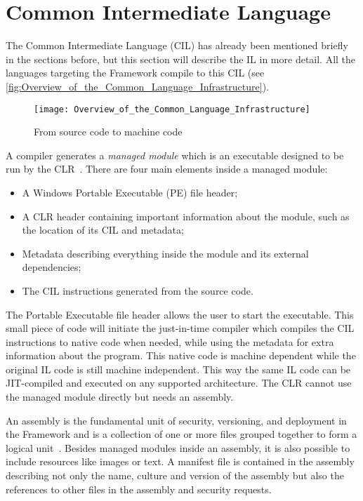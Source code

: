 \section{Common Intermediate Language}
\label{sec:TheIntermediateLanguage}
The Common Intermediate Language (CIL) has already been mentioned briefly in the sections before, but this section will describe the IL in more detail.
All the languages targeting the \dotNET Framework compile to this CIL (see \autoref{fig:Overview_of_the_Common_Language_Infrastructure}).

\begin{figure}[htbp]
  \centering
  \texttt{[image: Overview\_of\_the\_Common\_Language\_Infrastructure]}
  \caption{From source code to machine code}
  \label{fig:Overview_of_the_Common_Language_Infrastructure}
\end{figure}

A \dotNET compiler generates a \emph{managed module} which is an executable designed to be run by the CLR~\cite{Prosise2002}.
There are four main elements inside a managed module:

\begin{itemize}[noitemsep]
  \item A Windows Portable Executable (PE) file header;
  \item A CLR header containing important information about the module, such as the location of its CIL and metadata;
  \item Metadata describing everything inside the module and its external dependencies;
  \item The CIL instructions generated from the source code.
\end{itemize}

The Portable Executable file header allows the user to start the executable.
This small piece of code will initiate the just-in-time compiler which compiles the CIL instructions to native code when needed, while using the metadata for extra information about the program.
This native code is machine dependent while the original IL code is still machine independent.
This way the same IL code can be JIT-compiled and executed on any supported architecture.
The CLR cannot use the managed module directly but needs an assembly. 

An assembly is the fundamental unit of security, versioning, and deployment in the \dotNET Framework and is a collection of one or more files grouped together to form a logical unit~\cite{Prosise2002}.
Besides managed modules inside an assembly, it is also possible to include resources like images or text.
A manifest file is contained in the assembly describing not only the name, culture and version of the assembly but also the references to other files in the assembly and security requests.

